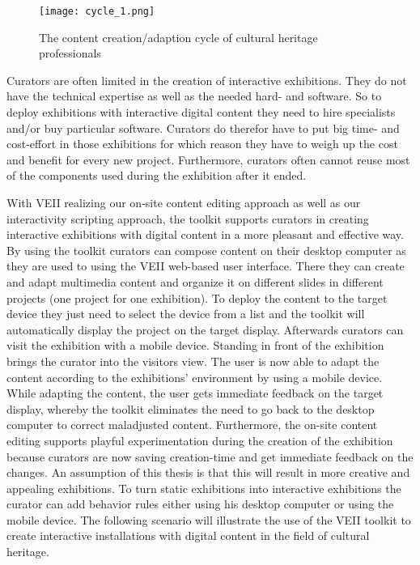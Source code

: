 \begin{figure}
  \begin{center}
    \texttt{[image: cycle\_1.png]}
    \caption{The content creation/adaption cycle of cultural heritage professionals}
    \label{fig:cycle_1}
  \end{center}
\end{figure}

Curators are often limited in the creation of interactive exhibitions. They do not have the technical expertise as well as the needed hard- and software. So to deploy exhibitions with interactive digital content they need to hire specialists and/or buy particular software. Curators do therefor have to put big time- and cost-effort in those exhibitions for which reason they have to weigh up the cost and benefit for every new project. Furthermore, curators often cannot reuse most of the components used during the exhibition after it ended. 

With VEII realizing our on-site content editing approach as well as our interactivity scripting approach, the toolkit supports curators in creating interactive exhibitions with digital content in a more pleasant and effective way. By using the toolkit curators can compose content on their desktop computer as they are used to using the VEII web-based user interface. There they can create and adapt multimedia content and organize it on different slides in different projects (one project for one exhibition). To deploy the content to the target device they just need to select the device from a list and the toolkit will automatically display the project on the target display. Afterwards curators can visit the exhibition with a mobile device. Standing in front of the exhibition brings the curator into the visitors view. The user is now able to adapt the content according to the exhibitions' environment by using a mobile device. While adapting the content, the user gets immediate feedback on the target display, whereby the toolkit eliminates the need to go back to the desktop computer to correct maladjusted content. Furthermore, the on-site content editing supports playful experimentation during the creation of the exhibition because curators are now saving creation-time and get immediate feedback on the changes. An assumption of this thesis is that this will result in more creative and appealing exhibitions.
To turn static exhibitions into interactive exhibitions the curator can add behavior rules either using his desktop computer or using the mobile device. The following scenario will illustrate the use of the VEII toolkit to create interactive installations with digital content in the field of cultural heritage.

